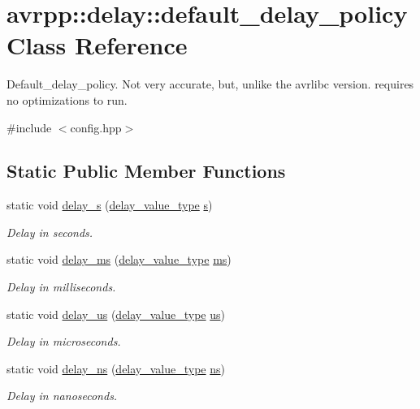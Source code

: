 \hypertarget{classavrpp_1_1delay_1_1default__delay__policy}{
\section{avrpp::delay::default\_\-delay\_\-policy Class Reference}
\label{classavrpp_1_1delay_1_1default__delay__policy}
}


Default\_\-delay\_\-policy. Not very accurate, but, unlike the avrlibc version. requires no optimizations to run.  




{\ttfamily \#include $<$config.hpp$>$}

\subsection*{Static Public Member Functions}
\begin{DoxyCompactItemize}
\item 
static void \hyperlink{classavrpp_1_1delay_1_1default__delay__policy_a850b87a64aa19dcf999215e1ffec8b5a}{delay\_\-s} (\hyperlink{namespaceavrpp_1_1delay_a64f093ce9e68cc79894a8549286594f0}{delay\_\-value\_\-type} \hyperlink{structavrpp_1_1delay_1_1s}{s})
\begin{DoxyCompactList}\small\item\em Delay in seconds. \item\end{DoxyCompactList}\item 
static void \hyperlink{classavrpp_1_1delay_1_1default__delay__policy_a3b094bc550cbeafbfa6f1a1b7e2414a1}{delay\_\-ms} (\hyperlink{namespaceavrpp_1_1delay_a64f093ce9e68cc79894a8549286594f0}{delay\_\-value\_\-type} \hyperlink{structavrpp_1_1delay_1_1ms}{ms})
\begin{DoxyCompactList}\small\item\em Delay in milliseconds. \item\end{DoxyCompactList}\item 
static void \hyperlink{classavrpp_1_1delay_1_1default__delay__policy_accf1820644221a51830df3d8ef9e45ef}{delay\_\-us} (\hyperlink{namespaceavrpp_1_1delay_a64f093ce9e68cc79894a8549286594f0}{delay\_\-value\_\-type} \hyperlink{structavrpp_1_1delay_1_1us}{us})
\begin{DoxyCompactList}\small\item\em Delay in microseconds. \item\end{DoxyCompactList}\item 
static void \hyperlink{classavrpp_1_1delay_1_1default__delay__policy_a48ab7f9b8ebbcdd376f5ee42893bcd44}{delay\_\-ns} (\hyperlink{namespaceavrpp_1_1delay_a64f093ce9e68cc79894a8549286594f0}{delay\_\-value\_\-type} \hyperlink{structavrpp_1_1delay_1_1ns}{ns})
\begin{DoxyCompactList}\small\item\em Delay in nanoseconds. \item\end{DoxyCompactList}\end{DoxyCompactItemize}



